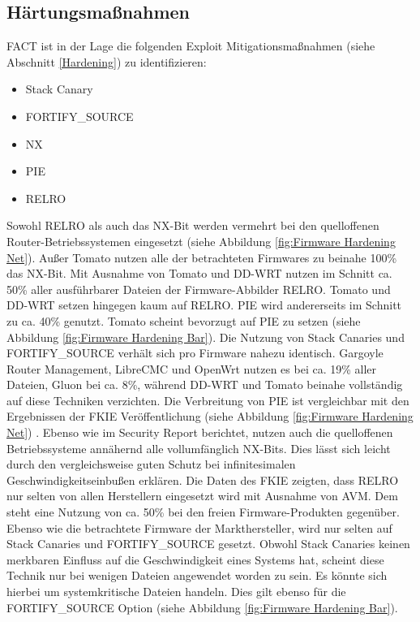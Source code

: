 \documentclass[a4paper]{book}
\begin{document}
\begin{large}
\begin{onehalfspace}
\end{onehalfspace}


\subsection{Härtungsmaßnahmen}
\begin{onehalfspace}
FACT ist in der Lage die folgenden Exploit Mitigationsmaßnahmen (siehe Abschnitt \ref{Hardening}) zu identifizieren:

\begin{itemize}
\setlength\itemsep{0.01em}
\item Stack Canary
\item FORTIFY\_SOURCE
\item NX
\item PIE
\item RELRO
\end{itemize}


\noindent Sowohl RELRO als auch das NX-Bit werden vermehrt bei den quelloffenen Router-Betriebssystemen eingesetzt (siehe Abbildung \ref{fig:Firmware Hardening Net}). Außer Tomato nutzen alle der betrachteten Firmwares zu beinahe 100\% das NX-Bit. Mit Ausnahme von Tomato und DD-WRT nutzen im Schnitt ca. 50\% aller ausführbarer Dateien der Firmware-Abbilder RELRO. Tomato und DD-WRT setzen hingegen kaum auf RELRO. PIE wird andererseits im Schnitt zu ca. 40\% genutzt. Tomato scheint bevorzugt auf PIE zu setzen (siehe Abbildung \ref{fig:Firmware Hardening Bar}). Die Nutzung von Stack Canaries und FORTIFY\_SOURCE verhält sich pro Firmware nahezu identisch. Gargoyle Router Management, LibreCMC und OpenWrt nutzen es bei ca. 19\% aller Dateien, Gluon bei ca. 8\%, während DD-WRT und Tomato beinahe vollständig auf diese Techniken verzichten. 
Die Verbreitung von PIE ist vergleichbar mit den Ergebnissen der FKIE Veröffentlichung (siehe Abbildung \ref{fig:Firmware Hardening Net}) \cite[p.~15]{PeterWeidenbachJohannesvomDorp.2020}. Ebenso wie im \glqq Security Report\grqq{} berichtet, nutzen auch die quelloffenen Betriebssysteme annähernd alle vollumfänglich NX-Bits. Dies lässt sich leicht durch den vergleichsweise guten Schutz bei infinitesimalen Geschwindigkeitseinbußen erklären. Die Daten des FKIE zeigten, dass RELRO nur selten von allen Herstellern eingesetzt wird mit Ausnahme von AVM. Dem steht eine Nutzung von ca. 50\% bei den freien Firmware-Produkten gegenüber. Ebenso wie die betrachtete Firmware der Markthersteller, wird nur selten auf Stack Canaries und FORTIFY\_SOURCE gesetzt. Obwohl Stack Canaries keinen merkbaren Einfluss auf die Geschwindigkeit eines Systems hat, scheint diese Technik nur bei wenigen Dateien angewendet worden zu sein. Es könnte sich hierbei um systemkritische Dateien handeln. Dies gilt ebenso für die FORTIFY\_SOURCE Option (siehe Abbildung \ref{fig:Firmware Hardening Bar}). \\ 



\end{onehalfspace}
\end{large}
\end{document}

